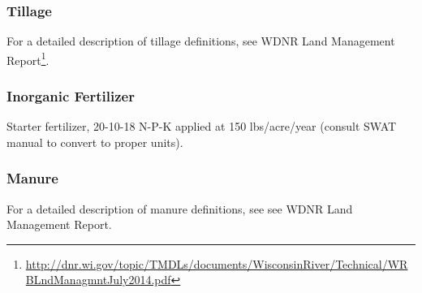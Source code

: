 \subsubsection{Tillage}
For a detailed description of tillage definitions, see WDNR Land Management Report\footnote{\url{http://dnr.wi.gov/topic/TMDLs/documents/WisconsinRiver/Technical/WRBLndManagmntJuly2014.pdf}}.
\subsubsection{Inorganic Fertilizer}
Starter fertilizer, 20-10-18 N-P-K applied at 150 lbs/acre/year (consult SWAT manual to convert to proper units).
\subsubsection{Manure}
For a detailed description of manure definitions, see see WDNR Land Management Report\footnotemark[\value{footnote}].